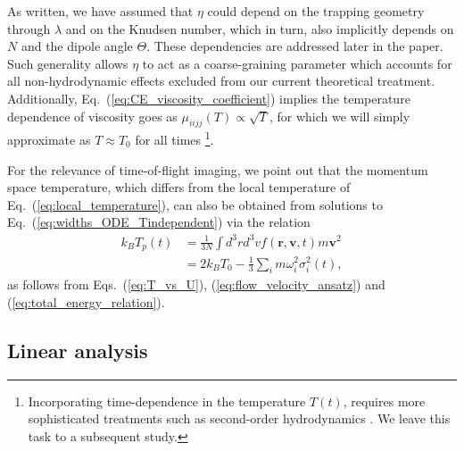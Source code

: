 \documentclass[reprint, amsmath, amssymb, aps, superscriptaddress]{revtex4-1}
\begin{document}
As written, we have assumed that $\eta$ could depend on the trapping geometry through $\lambda$ and on the Knudsen number, which in turn, also implicitly depends on $N$ and the dipole angle $\Theta$. These dependencies are addressed later in the paper.  
Such generality allows $\eta$ to act as a coarse-graining parameter which accounts for all non-hydrodynamic effects excluded from our current theoretical treatment. 
Additionally, Eq.~(\ref{eq:CE_viscosity_coefficient}) implies the temperature dependence of viscosity goes as $\mu_{i i j j}(T) \propto \sqrt{ T }$, for which we will simply approximate as $T \approx T_0$ for all times 
\footnote{
Incorporating time-dependence in the temperature $T(t)$, requires more sophisticated treatments such as second-order hydrodynamics \cite{Lewis17_IOP}. We leave this task to a subsequent study.
}.


For the relevance of time-of-flight imaging, we point out that the momentum space temperature, which differs from the local temperature of Eq.~(\ref{eq:local_temperature}), can also be obtained from solutions to Eq.~(\ref{eq:widths_ODE_Tindependent}) via the relation
\begin{align} \label{eq:momentum_temperature}
    k_B T_{p}(t)
    &=
    \frac{ 1 }{ 3 N } \int d^3 r d^3 v f(\boldsymbol{r}, \boldsymbol{v}, t) m \boldsymbol{v}^2 \nonumber\\
    &= 
    2 k_B T_0
    -
    \frac{ 1 }{ 3 } \sum_i m \omega_i^2 \sigma_i^2(t),
\end{align}
as follows from Eqs.~(\ref{eq:T_vs_U}), (\ref{eq:flow_velocity_ansatz}) and (\ref{eq:total_energy_relation}).

\subsection{ Linear analysis \label{subsec:linear_EOM} }
\end{document}
